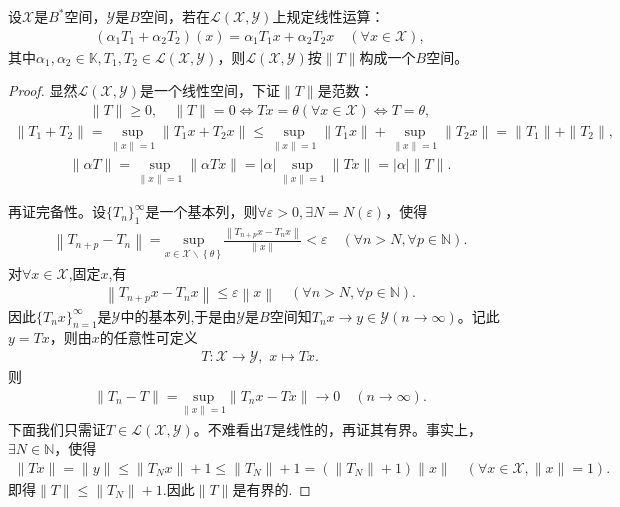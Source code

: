 \documentclass[../../main.tex]{subfiles}%
\begin{document}
\begin{theorem}\label{theorem:有界线性算子全体构成的空间完备}
设$\mathscr{X}$是$B^*$空间，$\mathscr{Y}$是$B$空间，若在$\mathscr{L}(\mathscr{X},\mathscr{Y})$上规定线性运算：
\begin{align*}
(\alpha_1T_1+\alpha_2T_2)(x)=\alpha_1T_1x+\alpha_2T_2x\quad (\forall x\in\mathscr{X}),
\end{align*}
其中$\alpha_1,\alpha_2\in\mathbb{K},T_1,T_2\in\mathscr{L}(\mathscr{X},\mathscr{Y})$，则$\mathscr{L}(\mathscr{X},\mathscr{Y})$按$\|T\|$构成一个$B$空间。
\end{theorem}
\begin{proof}

显然$\mathscr{L}(\mathscr{X},\mathscr{Y})$是一个线性空间，下证$\|T\|$是范数：
\begin{align*}
\|T\|\geqslant 0,\quad \|T\|=0\iff Tx=\theta(\forall x\in\mathscr{X})\iff T=\theta,
\end{align*}
\begin{align*}
\|T_1+T_2\|=\sup_{\|x\|=1}\|T_1x+T_2x\|
\leqslant \sup_{\|x\|=1}\|T_1x\|+\sup_{\|x\|=1}\|T_2x\|
=\|T_1\|+\|T_2\|,
\end{align*}
\begin{align*}
\|\alpha T\|=\sup_{\|x\|=1}\|\alpha Tx\|=|\alpha|\sup_{\|x\|=1}\|Tx\|=|\alpha|\|T\|.
\end{align*}

再证完备性。设$\{T_n\}_1^\infty$是一个基本列，则$\forall \varepsilon>0,\exists N=N(\varepsilon)$，使得
\begin{align*}
\left\| T_{n+p}-T_n \right\| =\underset{x\in \mathscr{X} \backslash \left\{ \theta \right\}}{\mathrm{sup}}\frac{\left\| T_{n+p}x-T_nx \right\|}{\left\| x \right\|}<\varepsilon \quad (\forall n>N,\forall p\in \mathbb{N} ).
\end{align*}
对$\forall x\in\mathscr{X}$,固定$x$,有
\begin{align*}
\left\| T_{n+p}x-T_nx \right\| \leqslant \varepsilon \left\| x \right\| \quad (\forall n>N,\forall p\in \mathbb{N} ).
\end{align*}
因此$\{T_nx\}_{n=1}^{\infty}$是$\mathscr{Y}$中的基本列,于是由$\mathscr{Y}$是$B$空间知$T_nx\to y\in\mathscr{Y}(n\to\infty)$。记此$y=Tx$，则由$x$的任意性可定义
\begin{align*}
T:\mathscr{X}\to \mathscr{Y},\,\,x\mapsto Tx.
\end{align*}
则
\begin{align*}
\left\| T_n-T \right\| =\underset{\left\| x \right\| =1}{\mathrm{sup}}\left\| T_nx-Tx \right\| \rightarrow 0\quad \left( n\rightarrow \infty \right) .
\end{align*}
下面我们只需证$T\in\mathscr{L}(\mathscr{X},\mathscr{Y})$。不难看出$T$是线性的，再证其有界。事实上，$\exists N\in\mathbb{N}$，使得
\begin{align*}
\|Tx\|=\|y\|\leqslant \|T_Nx\|+1\leqslant \|T_N\|+1=(\|T_N\|+1)\|x\|\quad (\forall x\in\mathscr{X},\|x\|=1).
\end{align*}
即得$\|T\|\leqslant \|T_N\|+1$.因此$\|T\|$是有界的.

\end{proof}
\end{document}
